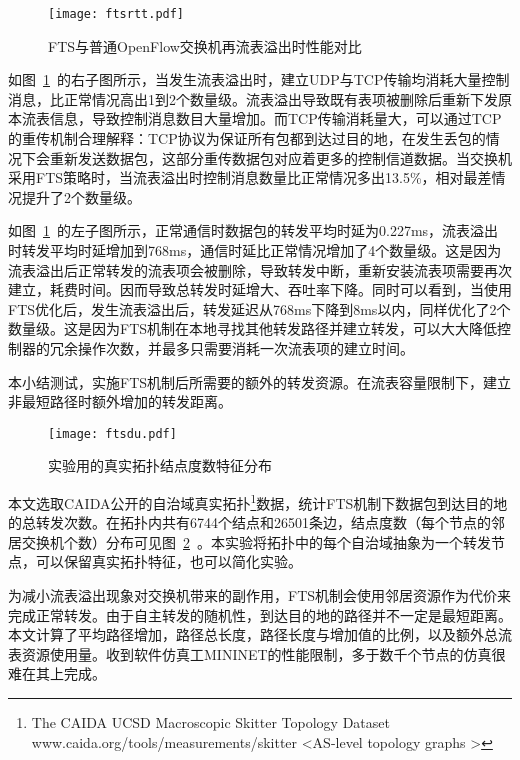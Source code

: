 \begin{figure}[!ht]
	\centering 
	\vspace{-1.5mm} 
	\texttt{[image: ftsrtt.pdf]}
	\caption{FTS与普通OpenFlow交换机再流表溢出时性能对比} \label{fig:ftsrtt}
\end{figure}

如图~\ref{fig:ftsrtt}~的右子图所示，当发生流表溢出时，建立UDP与TCP传输均消耗大量控制消息，比正常情况高出1到2个数量级。流表溢出导致既有表项被删除后重新下发原本流表信息，导致控制消息数目大量增加。而TCP传输消耗量大，可以通过TCP 的重传机制合理解释：TCP协议为保证所有包都到达过目的地，在发生丢包的情况下会重新发送数据包，这部分重传数据包对应着更多的控制信道数据。当交换机采用FTS策略时，当流表溢出时控制消息数量比正常情况多出13.5\%，相对最差情况提升了2个数量级。

如图~\ref{fig:ftsrtt}~的左子图所示，正常通信时数据包的转发平均时延为0.227ms，流表溢出时转发平均时延增加到768ms，通信时延比正常情况增加了4个数量级。这是因为流表溢出后正常转发的流表项会被删除，导致转发中断，重新安装流表项需要再次建立，耗费时间。因而导致总转发时延增大、吞吐率下降。同时可以看到，当使用FTS优化后，发生流表溢出后，转发延迟从768ms下降到8ms以内，同样优化了2个数量级。这是因为FTS机制在本地寻找其他转发路径并建立转发，可以大大降低控制器的冗余操作次数，并最多只需要消耗一次流表项的建立时间。


本小结测试，实施FTS机制后所需要的额外的转发资源。在流表容量限制下，建立非最短路径时额外增加的转发距离。

\begin{figure}[!ht]
	\centering 
	\vspace{-1.5mm} 
	\texttt{[image: ftsdu.pdf]}
	\caption{实验用的真实拓扑结点度数特征分布} \label{fig:ftsdu}
\end{figure}

本文选取CAIDA公开的自治域真实拓扑\footnote{The CAIDA UCSD Macroscopic Skitter Topology Dataset  www.caida.org/tools/measurements/skitter <AS-level topology graphs > }数据，统计FTS机制下数据包到达目的地的总转发次数。在拓扑内共有6744个结点和26501条边，结点度数（每个节点的邻居交换机个数）分布可见图~\ref{fig:ftsdu}~。本实验将拓扑中的每个自治域抽象为一个转发节点，可以保留真实拓扑特征，也可以简化实验。

为减小流表溢出现象对交换机带来的副作用，FTS机制会使用邻居资源作为代价来完成正常转发。由于自主转发的随机性，到达目的地的路径并不一定是最短距离。本文计算了平均路径增加，路径总长度，路径长度与增加值的比例，以及额外总流表资源使用量。收到软件仿真工MININET的性能限制，多于数千个节点的仿真很难在其上完成。

